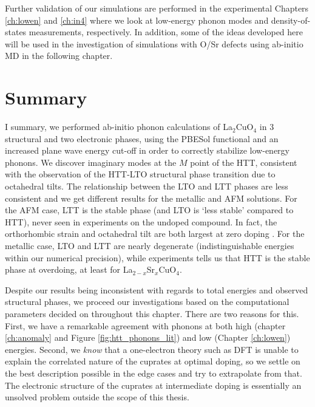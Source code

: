 Further validation of our simulations are performed in the experimental Chapters \ref{ch:lowen} and \ref{ch:in4} where we look at low-energy phonon modes and density-of-states measurements, respectively. In addition, some of the ideas developed here will be used in the investigation of simulations with O/Sr defects using ab-initio MD in the following chapter.

\section{Summary}
I summary, we performed ab-initio phonon calculations of La$_2$CuO$_4$ in 3 structural and two electronic phases, using the PBESol functional and an increased plane wave energy cut-off in order to correctly stabilize low-energy phonons. We discover imaginary modes at the $M$ point of the HTT, consistent with the observation of the HTT-LTO structural phase transition due to octahedral tilts. The relationship between the LTO and LTT phases are less consistent and we get different results for the metallic and AFM solutions. For the AFM case, LTT is the stable phase (and LTO is `less stable' compared to HTT), never seen in experiments on the undoped compound. In fact, the orthorhombic strain and octahedral tilt are both largest at zero doping \cite{Radaelli1994a}. For the metallic case, LTO and LTT are nearly degenerate (indistinguishable energies within our numerical precision), while experiments tells us that HTT is the stable phase at overdoing, at least for La$_{2-x}$Sr$_x$CuO$_4$.

Despite our results being inconsistent with regards to total energies and observed structural phases, we proceed our investigations based on the computational parameters decided on throughout this chapter. There are two reasons for this. First, we have a remarkable agreement with phonons at both high (chapter \ref{ch:anomaly} and Figure \ref{fig:htt_phonons_lit}) and low (Chapter \ref{ch:lowen}) energies. Second, we \emph{know} that a one-electron theory such as DFT is unable to explain the correlated nature of the cuprates at optimal doping, so we settle on the best description possible in the edge cases and try to extrapolate from that. The electronic structure of the cuprates at intermediate doping is essentially an unsolved problem outside the scope of this thesis.
